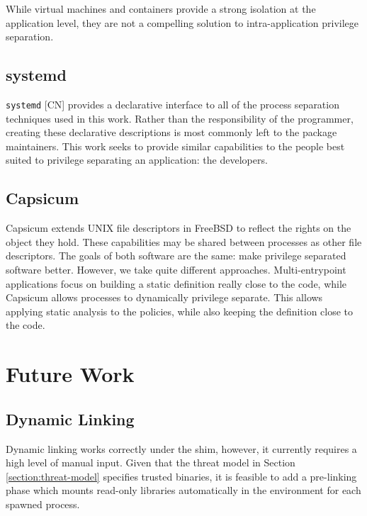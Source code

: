 \documentclass[sigplan]{acmart}
\begin{document}
While virtual machines and containers provide a strong isolation at the application level, they are not a compelling solution to intra-application privilege separation.

\subsection{systemd}

\texttt{systemd} [CN] provides a declarative interface to all of the process separation techniques used in this work. Rather than the responsibility of the programmer, creating these declarative descriptions is most commonly left to the package maintainers. This work seeks to provide similar capabilities to the people best suited to privilege separating an application: the developers.

\subsection{Capsicum}

Capsicum \citep{watson_capsicum_2010} extends UNIX file descriptors in FreeBSD to reflect the rights on the object they hold. These capabilities may be shared between processes as other file descriptors. The goals of both software are the same: make privilege separated software better. However, we take quite different approaches. Multi-entrypoint applications focus on building a static definition really close to the code, while Capsicum allows processes to dynamically privilege separate. This allows applying static analysis to the policies, while also keeping the definition close to the code.

\section{Future Work}

\subsection{Dynamic Linking}

Dynamic linking works correctly under the shim, however, it currently requires a high level of manual input. Given that the threat model in Section \ref{section:threat-model} specifies trusted binaries, it is feasible to add a pre-linking phase which mounts read-only libraries automatically in the environment for each spawned process.

\end{document}
